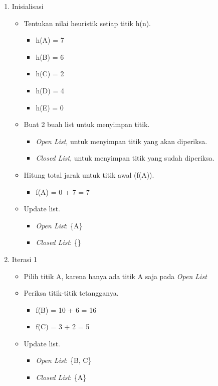 \begin{enumerate}
    \item Inisialisasi
    \begin{itemize}
        \item Tentukan nilai heuristik setiap titik h(n).
        \begin{itemize}
            \item h(A) = 7
            \item h(B) = 6
            \item h(C) = 2
            \item h(D) = 4
            \item h(E) = 0 
        \end{itemize}
        \item Buat 2 buah list untuk menyimpan titik.
        \begin{itemize}
            \item \textit{Open List}, untuk menyimpan titik yang akan diperiksa.
            \item \textit{Closed List}, untuk menyimpan titik yang sudah diperiksa.
        \end{itemize}
        \item Hitung total jarak untuk titik awal (f(A)).
        \begin{itemize}
            \item f(A) = 0 + 7 = 7
        \end{itemize}
        \item Update list.
        \begin{itemize}
            \item \textit{Open List}: \{A\}
            \item \textit{Closed List}: \{\}
        \end{itemize}
    \end{itemize}

    \item Iterasi 1
    \begin{itemize}
        \item Pilih titik A, karena hanya ada titik A saja pada \textit{Open List}
        \item Periksa titik-titik tetangganya.
        \begin{itemize}
            \item f(B) = 10 + 6 = 16
            \item f(C) = 3 + 2 = 5
        \end{itemize}
        \item Update list.
        \begin{itemize}
            \item \textit{Open List}: \{B, C\}
            \item \textit{Closed List}: \{A\}
        \end{itemize}
    \end{itemize}


\end{enumerate}
